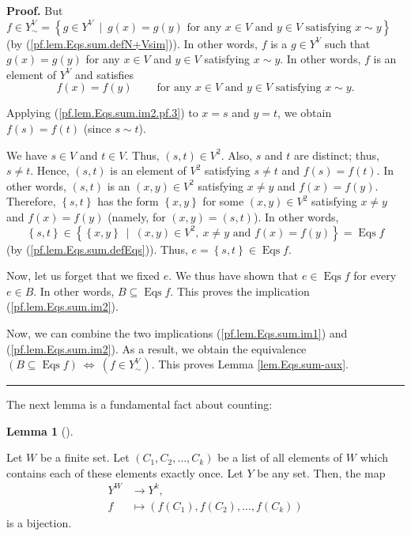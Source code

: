 \documentclass[numbers=enddot,12pt,final,onecolumn,notitlepage]{scrartcl}%
\theoremstyle{definition}
\newtheorem{lem}[theo]{Lemma}
\newenvironment{lemma}[1][]
{\begin{lem}[#1]\begin{leftbar}}
{\end{leftbar}\end{lem}}
\newenvironment{proof}[1][Proof]{\noindent\textbf{#1.} }{\ \rule{0.5em}{0.5em}}
\newenvironment{verlong}{}{}
\begin{document}
\begin{verlong}
\begin{proof}
But $f\in Y_{\sim}^{V}=\left\{  g\in Y^{V}\ \mid\ g\left(  x\right)  =g\left(
y\right)  \text{ for any }x\in V\text{ and }y\in V\text{ satisfying }x\sim
y\right\}  $ (by (\ref{pf.lem.Eqs.sum.defN+Vsim})). In other words, $f$ is a
$g\in Y^{V}$ such that $g\left(  x\right)  =g\left(  y\right)  $ for any $x\in
V$ and $y\in V$ satisfying $x\sim y$. In other words, $f$ is an element of
$Y^{V}$ and satisfies%
\begin{equation}
f\left(  x\right)  =f\left(  y\right)  \ \ \ \ \ \ \ \ \ \ \text{for any }x\in
V\text{ and }y\in V\text{ satisfying }x\sim y. \label{pf.lem.Eqs.sum.im2.pf.3}%
\end{equation}


Applying (\ref{pf.lem.Eqs.sum.im2.pf.3}) to $x=s$ and $y=t$, we obtain
$f\left(  s\right)  =f\left(  t\right)  $ (since $s\sim t$).

We have $s\in V$ and $t\in V$. Thus, $\left(  s,t\right)  \in V^{2}$. Also,
$s$ and $t$ are distinct; thus, $s\neq t$. Hence, $\left(  s,t\right)  $ is an
element of $V^{2}$ satisfying $s\neq t$ and $f\left(  s\right)  =f\left(
t\right)  $. In other words, $\left(  s,t\right)  $ is an $\left(  x,y\right)
\in V^{2}$ satisfying $x\neq y$ and $f\left(  x\right)  =f\left(  y\right)  $.
Therefore, $\left\{  s,t\right\}  $ has the form $\left\{  x,y\right\}  $ for
some $\left(  x,y\right)  \in V^{2}$ satisfying $x\neq y$ and $f\left(
x\right)  =f\left(  y\right)  $ (namely, for $\left(  x,y\right)  =\left(
s,t\right)  $). In other words,%
\[
\left\{  s,t\right\}  \in\left\{  \left\{  x,y\right\}  \ \mid\ \left(
x,y\right)  \in V^{2},\ x\neq y\text{ and }f\left(  x\right)  =f\left(
y\right)  \right\}  =\operatorname*{Eqs}f
\]
(by (\ref{pf.lem.Eqs.sum.defEqs})). Thus, $e=\left\{  s,t\right\}
\in\operatorname*{Eqs}f$.

Now, let us forget that we fixed $e$. We thus have shown that $e\in
\operatorname*{Eqs}f$ for every $e\in B$. In other words, $B\subseteq
\operatorname*{Eqs}f$. This proves the implication (\ref{pf.lem.Eqs.sum.im2}).

Now, we can combine the two implications (\ref{pf.lem.Eqs.sum.im1}) and
(\ref{pf.lem.Eqs.sum.im2}). As a result, we obtain the equivalence $\left(
B\subseteq\operatorname*{Eqs}f\right)  \ \Longleftrightarrow\ \left(  f\in
Y_{\sim}^{V}\right)  $. This proves Lemma \ref{lem.Eqs.sum-aux}.
\end{proof}

The next lemma is a fundamental fact about counting:

\begin{lemma}
\label{lem.function-count}Let $W$ be a finite set. Let $\left(  C_{1}%
,C_{2},\ldots,C_{k}\right)  $ be a list of all elements of $W$ which contains
each of these elements exactly once. Let $Y$ be any set. Then, the map
\begin{align*}
Y^{W}  &  \rightarrow Y^{k},\\
f  &  \mapsto\left(  f\left(  C_{1}\right)  ,f\left(  C_{2}\right)
,\ldots,f\left(  C_{k}\right)  \right)
\end{align*}
is a bijection.
\end{lemma}


\end{verlong}
\end{document}

